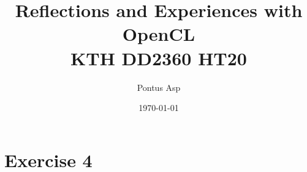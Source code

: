 \documentclass[a4paper, 12pt]{article}
\begin{document}
\title{\vspace{4.0cm}Reflections and Experiences with OpenCL\\
\large KTH DD2360 HT20}
\author{Pontus Asp}
\date{\today}
\maketitle
\thispagestyle{empty}
\newpage

\clearpage
{}


%
%
%
\section{Exercise 4}


\end{document}
